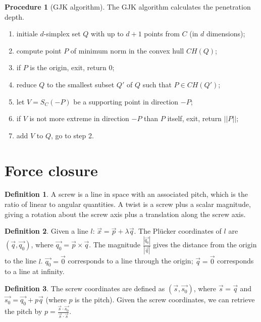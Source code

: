 \documentclass{article}
\theoremstyle{definition}
\newtheorem{definition}{Definition}[section]
\newtheorem{procedure}{Procedure}[section]
\begin{document}
\begin{procedure}[GJK algorithm] The GJK algorithm calculates the penetration depth.
\begin{enumerate}
\item initiale $d$-simplex set $Q$ with up to $d+1$ points from $C$ (in $d$ dimensions);
\item compute point $P$ of minimum norm in the convex hull $CH(Q)$;
\item if $P$ is the origin, exit, return $0$;
\item reduce $Q$ to the smallest subset $Q'$ of $Q$ such that $P \in CH(Q')$;
\item let $V = S_C(-P)$ be a supporting point in direction $-P$;
\item if $V$ is not more extreme in direction $-P$ than $P$ itself, exit, return $||P||$;
\item add $V$ to $Q$, go to step 2.
\end{enumerate}
\end{procedure}

\section{Force closure}
\begin{definition}
A screw is a line in space with an associated pitch, which is the ratio of linear to angular quantities. A twist is a screw plus a scalar magnitude, giving a rotation about the screw axis plus a translation along the screw axis.
\end{definition}

\begin{definition}
Given a line $l$: $\vec{x} = \vec{p} + \lambda \vec{q}$. The Pl\"ucker coordinates of $l$ are $(\vec{q}, \vec{q_0})$, where $\vec{q_0} = \vec{p} \times \vec{q}$. The magnitude $\frac{|\vec{q_0}|}{|\vec{q}|}$ gives the distance from the origin to the line $l$. $\vec{q_0} = \vec{0}$ corresponds to a line through the origin; $\vec{q} = \vec{0}$ corresponds to a line at infinity.
\end{definition}

\begin{definition}
The screw coordinates are defined as $(\vec{s}, \vec{s_0})$, where $\vec{s} = \vec{q}$ and $\vec{s_0} = \vec{q_0} + p\vec{q}$ (where $p$ is the pitch).\newline
Given the screw coordinates, we can retrieve the pitch by $p = \frac{\vec{s} \cdot \vec{s_0}}{\vec{s} \cdot \vec{s}}$.
\end{definition}
\end{document}
